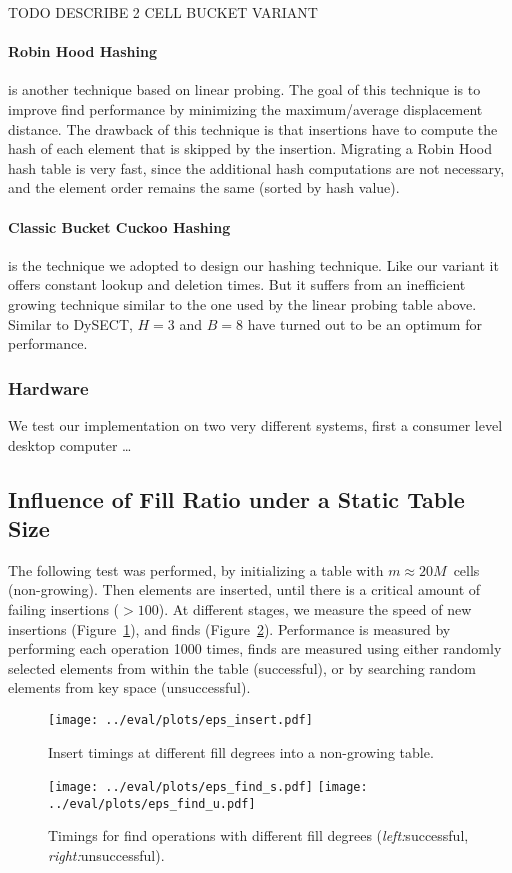 \documentclass[a4paper,UKenglish]{lipics-v2016}
\begin{document}
TODO DESCRIBE 2 CELL BUCKET VARIANT

\paragraph*{Robin Hood Hashing} is another technique based on linear probing. The
goal of this technique is to improve find performance by minimizing
the maximum/average displacement distance.  The drawback of this
technique is that insertions have to compute the hash of each element
that is skipped by the insertion.  Migrating a Robin Hood hash table
is very fast, since the additional hash computations are not
necessary, and the element order remains the same (sorted by hash value).

\paragraph*{Classic Bucket Cuckoo Hashing} is the technique we adopted to
design our hashing technique.  Like our variant it offers constant
lookup and deletion times.  But it suffers from an inefficient
growing technique similar to the one used by the linear probing table above.
Similar to DySECT, $H=3$ and $B=8$ have turned out to be an optimum
for performance.

\subsubsection*{Hardware}
We test our implementation on two very different systems, first a
consumer level desktop computer \ldots{}

\subsection{Influence of Fill Ratio under a Static Table Size}
\label{sec:exp_eps}

The following test was performed, by initializing a table with
$m\approx20M$~cells (non-growing). Then elements are inserted, until there
is a critical amount of failing insertions ($>100$).  At different
stages, we measure the speed of new insertions
(Figure~\ref{fig:eps_insert}), and finds (Figure~\ref{fig:eps_find}).
Performance is measured by performing each operation 1000 times, finds
are measured using either randomly selected elements from within the table (successful), or by
searching random elements from key space (unsuccessful).

\begin{figure}[ht]
  \centering
  \texttt{[image: ../eval/plots/eps\_insert.pdf]}
  \caption{\label{fig:eps_insert}Insert timings at different fill
    degrees into a non-growing table.}
\end{figure}
\begin{figure}[ht]
  \centering
  \texttt{[image: ../eval/plots/eps\_find\_s.pdf]}
  \texttt{[image: ../eval/plots/eps\_find\_u.pdf]}
  \caption{Timings for find operations with different fill degrees
    (\emph{left:}successful, \emph{right:}unsuccessful).}
  \label{fig:eps_find}
\end{figure}
\end{document}
